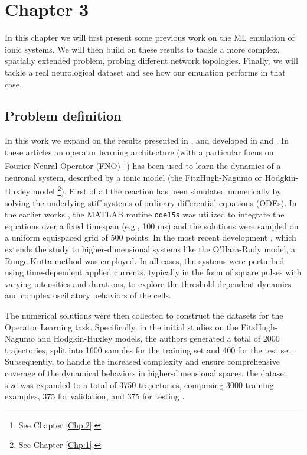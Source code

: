 \chapter{Chapter 3}
\label{Chpt3}
In this chapter we will first present some previous work on the ML emulation of ionic systems. We will then build on these results to tackle a more complex, spatially extended problem, probing different network topologies. Finally, we will tackle a real neurological dataset and see how our emulation performs in that case.

\section{Problem definition}
\label{chpt: Problem definition}
In this work we expand on the results presented in \cite{centofanti2024comconf}, and developed in \cite{centofanti2024cma} and \cite{pellegrini2025mlcse}. In these articles an operator learning architecture (with a particular focus on Fourier Neural Operator (FNO) \footnote{See Chapter \ref{Chp:2}.}) has been used to learn the dynamics of a neuronal system, described by a ionic model (the FitzHugh-Nagumo or Hodgkin-Huxley model \footnote{See Chapter \ref{Chp:1}.}). 
First of all the reaction has been simulated numerically by solving the underlying stiff systems of ordinary differential equations (ODEs). In the earlier works \cite{centofanti2024comconf, centofanti2024cma}, the MATLAB routine \texttt{ode15s} was utilized to integrate the equations over a fixed timespan (e.g., 100 ms) and the solutions were sampled on a uniform equispaced grid of 500 points. In the most recent development \cite{pellegrini2025mlcse}, which extends the study to higher-dimensional systems like the O'Hara-Rudy model, a Runge-Kutta method was employed. In all cases, the systems were perturbed using time-dependent applied currents, typically in the form of square pulses with varying intensities and durations, to explore the threshold-dependent dynamics and complex oscillatory behaviors of the cells.

The numerical solutions were then collected to construct the datasets for the Operator Learning task. Specifically, in the initial studies on the FitzHugh-Nagumo and Hodgkin-Huxley models, the authors generated a total of 2000 trajectories, split into 1600 samples for the training set and 400 for the test set \cite{centofanti2024comconf, centofanti2024cma}. Subsequently, to handle the increased complexity and ensure comprehensive coverage of the dynamical behaviors in higher-dimensional spaces, the dataset size was expanded to a total of 3750 trajectories, comprising 3000 training examples, 375 for validation, and 375 for testing \cite{pellegrini2025mlcse}.

